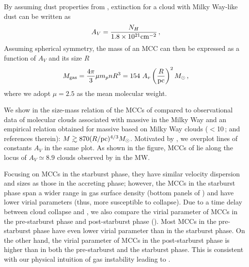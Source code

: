 \IfFileExists{emulateapjlegacy.cls}{\documentclass[iop]{emulateapjlegacy}}{\documentclass[iop]{emulateapj}}
\begin{document}
By assuming dust properties from \citet[][]{weingartner:2001}, extinction for a cloud with Milky Way-like dust can be written as 
\begin{equation}
A_V = \frac{N_H}{1.8 \times 10^{21} {\rm cm}^{-2}}\,,
\end{equation}
Assuming spherical symmetry, the mass of an MCC can then be expressed as a function of $A_V$ and its size $R$
\begin{equation}\label{eqn:constantcolumndensity}
M_{\rm gas} = \frac{4\pi}{3} \mu m_p n R^3 = 154~A_v \left(\frac{R}{\rm pc}\right)^2 \Msun \,,
\end{equation}
where we adopt $\mu = 2.5$ as the mean molecular weight.  

We show in  the size-mass relation of the MCCs of \flower compared to observational data of molecular clouds associated with massive \SF in the 
Milky Way \citep{Beuther02a, Mueller02a, Hill05a, Motte07a} and an empirical relation obtained for massive \SF based on Milky Way clouds ($<$10\,\Msun; \citealt{Kauffmann10b, Kauffmann10c} and references therein): $M \gtrsim 870(R/{\rm pc})^{4/3} M_\odot$.
Motivated by \obs, we overplot lines of constants $A_V$ in the same plot.
As shown in the figure, MCCs of \flower lie along the locus of $A_V \simeq 8.9$ clouds observed by
\citet{Lombardi10a} in the MW. 
%

Focusing on MCCs in the starburst phase, they have similar velocity dispersion and sizes 
as those in the accreting phase; however, the MCCs in the starburst phase span 
a wider range in gas surface density (bottom panels of ) and have lower virial parameters (thus, more susceptible to collapse).
Due to a time delay between cloud collapse and \SF, we also compare the virial parameter of MCCs in the pre-starburst phase and post-starburst phase
().
Most MCCs in the pre-starburst phase have even lower virial parameter than in the starburst phase. On the other hand, 
the virial parameter of MCCs in the post-starburst phase is higher than in both the pre-starburst and the starburst phase. 
This is consistent with our physical intuition of gas instability leading to \SF.
\end{document}
